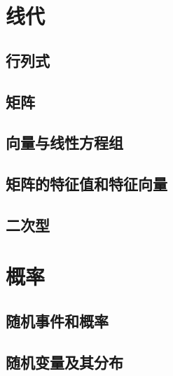 \documentclass[lang=cn,math=mtpro2,11pt,scheme=chinese]{elegantbook}
\begin{document}
\chapter{线代}

\section{行列式}

\vspace{2em}

\section{矩阵}

\vspace{2em}

\section{向量与线性方程组}

\vspace{2em}

\section{矩阵的特征值和特征向量}

\vspace{2em}

\section{二次型}

\vspace{2em}

\chapter{概率}

\section{随机事件和概率}

\vspace{2em}

\section{随机变量及其分布}

\vspace{2em}
\end{document}
